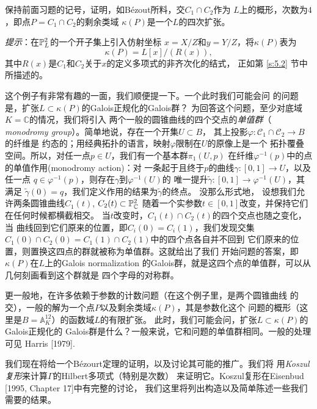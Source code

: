 
\begin{exe}\label{exe:3.76}
保持前面习题的记号，证明，如B\'ezout所料，交$C_1\cap C_2$作为
$L$上的概形，次数为$4$，即点$P=C_1\cap C_2$的剩余类域
$\kappa(P)$是一个$L$的四次扩张。

\textit{提示}：在$\P_L^2$的一个开子集上引入仿射坐标
$x=X/Z$和$y=Y/Z$，将$\kappa(P)$表为
\[
	\kappa(P)=L[x]/(R(x)),
\]
其中$R(x)$是$C_1$和$C_2$关于$x$的定义多项式的非齐次化的结式，
正如第 \ref{s:5.2} 节中所描述的。
\end{exe}

这个例子有非常有趣的一面，我们顺便提一下。一个此时我们可能会问
的问题是，扩张$L\subset \kappa(P)$的Galois正规化的Galois群？
为回答这个问题，至少对底域$K=\mathbb C$的情况，我们将引入
两个一般的圆锥曲线的四个交点的\textit{单值群}（
\textit{monodromy group}）。简单地说，存在一个开集$U\subset B$，
其上投影$\varphi:\mathscr C_1\cap \mathscr C_2\to B$的纤维是
约态的；用经典拓扑的语言，映射$\varphi$限制在$U$的原像上是一个
拓扑覆叠空间。所以，对任一点$p\in U$，我们有一个基本群$\pi_1(U,p)$
在纤维$\varphi^{-1}(p)$中的点的单值作用(monodromy action)：对
一条起于且终于$p$的曲线$\gamma:[0,1]\to U$，以及任一点
$q\in \varphi^{-1}(p)$，则存在$\gamma$到$\varphi^{-1}(U)$的
唯一提升$\tilde\gamma:[0,1]\to \varphi^{-1}(U)$，其满足
$\tilde\gamma(0)=q$，我们定义作用的结果为$\tilde\gamma$的终点。
没那么形式地，
设想我们允许两条圆锥曲线$C_1(t)$, $C_2(t)\subset \mathbb P_\cc^2$
随着一个实参数$t\in [0,1]$改变，并保持它们在任何时候都横截相交。
当$t$改变时，$C_1(t)\cap C_2(t)$的四个交点也随之变化，当
曲线回到它们原来的位置，即$C_i(0)=C_i(1)$，我们发现交集
$C_1(0)\cap C_2(0)=C_1(1)\cap C_2(1)$中的四个点各自并不回到
它们原来的位置，则置换这四点的群就被称为单值群。这就给出了我们
开始问题的答案，即$\kappa(P)$在$L$上的Galois normalization
的Galois群，就是这四个点的单值群，可以从几何刻画看到这个群就是
四个字母的对称群。

更一般地，在许多依赖于参数的计数问题（在这个例子里，是两个圆锥曲线
的交），一般的解为一个点$P$以及剩余类域$\kappa(P)$，其是参数化这个
问题的概形（这里是$B=\mathbb A_K^{12}$）的函数域$L$的有限扩张。
此时，我们可能会问，扩张$L\subset \kappa(P)$的Galois正规化的
Galois群是什么？一般来说，它和问题的单值群相同。一般的处理可见
Harris [1979].


我们现在将给一个B\'ezourt定理的证明，以及讨论其可能的推广。我们将
用\textit{Koszul复形}来计算$\Gamma$的Hilbert多项式（特别是次数）
来证明它。Koszul复形在Eisenbud [1995, Chapter 17]中有完整的讨论，
我们这里将列出构造以及简单陈述一些我们需要的结果。

